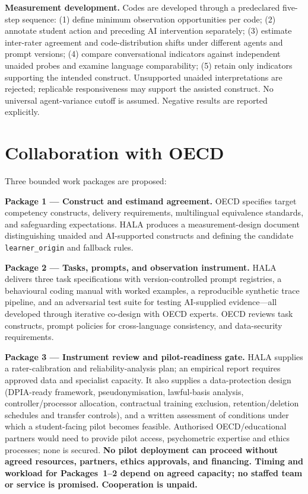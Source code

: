 \documentclass[10pt]{article}
\begin{document}
\smallskip\noindent\textbf{Measurement development.} Codes are developed through
a predeclared five-step sequence: (1) define minimum observation opportunities
per code; (2) annotate student action and preceding AI intervention separately;
(3) estimate inter-rater agreement and code-distribution shifts under different
agents and prompt versions; (4) compare conversational indicators against
independent unaided probes and examine language comparability; (5) retain only
indicators supporting the intended construct. Unsupported unaided interpretations
are rejected; replicable responsiveness may support the assisted construct.
No universal agent-variance cutoff is assumed. Negative results are reported explicitly.

\section{Collaboration with OECD}

\noindent Three bounded work packages are proposed:

\medskip\noindent\textbf{Package 1 --- Construct and estimand agreement.}
OECD specifies target competency constructs, delivery requirements, multilingual
equivalence standards, and safeguarding expectations.  HALA produces a
measurement-design document distinguishing unaided and AI-supported constructs
and defining the candidate \texttt{learner\_origin} and fallback rules.

\medskip\noindent\textbf{Package 2 --- Tasks, prompts, and observation
instrument.} HALA delivers three task specifications with version-controlled
prompt registries, a behavioural coding manual with worked examples, a
reproducible synthetic trace pipeline, and an adversarial test suite for
testing AI-supplied evidence---all developed through iterative co-design
with OECD experts.  OECD reviews task constructs, prompt policies for
cross-language consistency, and data-security requirements.

\medskip\noindent\textbf{Package 3 --- Instrument review and pilot-readiness
gate.} HALA supplies a rater-calibration and reliability-analysis plan; an empirical report
requires approved data and specialist capacity. It also supplies a data-protection design (DPIA-ready framework, pseudonymisation,
lawful-basis analysis, controller/processor allocation, contractual training
exclusion, retention/deletion schedules and transfer controls), and a written
assessment of conditions under which a student-facing pilot becomes feasible.
Authorised OECD/educational partners would need to provide pilot access,
psychometric expertise and ethics processes; none is secured.  \textbf{No pilot deployment can proceed without agreed
resources, partners, ethics approvals, and financing. Timing and workload for
Packages~1--2 depend on agreed capacity; no staffed team or service is promised.
Cooperation is unpaid.}
\end{document}
